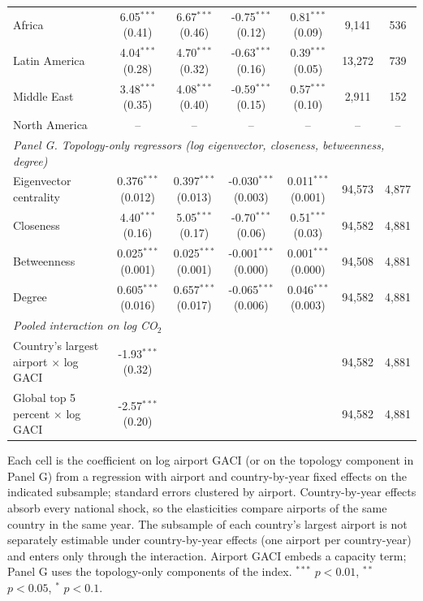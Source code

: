 \documentclass[12pt]{extarticle}
\begin{document}
\begin{table}[H]
{\begin{threeparttable}
\begin{tabular}{lcccccc}
  Africa & 6.05$^{***}$ (0.41) & 6.67$^{***}$ (0.46) & -0.75$^{***}$ (0.12) & 0.81$^{***}$ (0.09) & 9,141 & 536 \\
  Latin America & 4.04$^{***}$ (0.28) & 4.70$^{***}$ (0.32) & -0.63$^{***}$ (0.16) & 0.39$^{***}$ (0.05) & 13,272 & 739 \\
  Middle East & 3.48$^{***}$ (0.35) & 4.08$^{***}$ (0.40) & -0.59$^{***}$ (0.15) & 0.57$^{***}$ (0.10) & 2,911 & 152 \\
  North America & -- & -- & -- & -- & -- & -- \\
\multicolumn{7}{l}{\textit{Panel G. Topology-only regressors (log eigenvector, closeness, betweenness, degree)}} \\
  Eigenvector centrality & 0.376$^{***}$ (0.012) & 0.397$^{***}$ (0.013) & -0.030$^{***}$ (0.003) & 0.011$^{***}$ (0.001) & 94,573 & 4,877 \\
  Closeness & 4.40$^{***}$ (0.16) & 5.05$^{***}$ (0.17) & -0.70$^{***}$ (0.06) & 0.51$^{***}$ (0.03) & 94,582 & 4,881 \\
  Betweenness & 0.025$^{***}$ (0.001) & 0.025$^{***}$ (0.001) & -0.001$^{***}$ (0.000) & 0.001$^{***}$ (0.000) & 94,508 & 4,881 \\
  Degree & 0.605$^{***}$ (0.016) & 0.657$^{***}$ (0.017) & -0.065$^{***}$ (0.006) & 0.046$^{***}$ (0.003) & 94,582 & 4,881 \\
\midrule
\multicolumn{7}{l}{\textit{Pooled interaction on log CO$_2$}} \\
  Country's largest airport $\times$ log GACI & -1.93$^{***}$ (0.32) & & & & 94,582 & 4,881 \\
  Global top 5 percent $\times$ log GACI & -2.57$^{***}$ (0.20) & & & & 94,582 & 4,881 \\
\bottomrule
\end{tabular}
\begin{tablenotes}\scriptsize
\item Each cell is the coefficient on log airport GACI (or on the topology component in Panel G) from a regression with airport and country-by-year fixed effects on the indicated subsample; standard errors clustered by airport. Country-by-year effects absorb every national shock, so the elasticities compare airports of the same country in the same year. The subsample of each country's largest airport is not separately estimable under country-by-year effects (one airport per country-year) and enters only through the interaction. Airport GACI embeds a capacity term; Panel G uses the topology-only components of the index. $^{***}$ $p<0.01$, $^{**}$ $p<0.05$, $^{*}$ $p<0.1$.
\end{tablenotes}
\end{threeparttable}}
\end{table}
\end{document}
